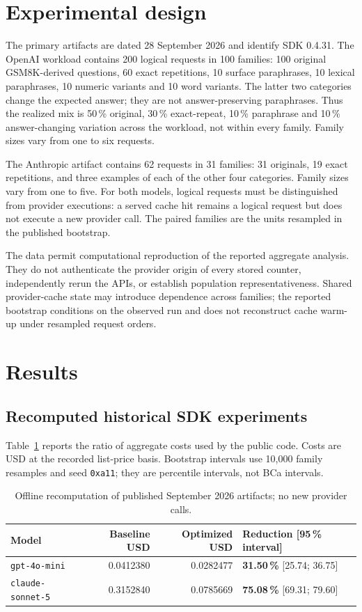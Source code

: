 \documentclass[11pt,a4paper]{article}
\begin{document}
\section{Experimental design}\label{sec:diseno}
The primary artifacts are dated 28 September 2026 and identify SDK 0.4.31. The OpenAI workload
contains 200 logical requests in 100 families: 100 original GSM8K-derived questions, 60 exact
repetitions, 10 surface paraphrases, 10 lexical paraphrases, 10 numeric variants and 10 word
variants. The latter two categories change the expected answer; they are not answer-preserving
paraphrases. Thus the realized mix is 50\,\% original, 30\,\% exact-repeat, 10\,\% paraphrase
and 10\,\% answer-changing variation across the workload, not within every family. Family sizes
vary from one to six requests.

The Anthropic artifact contains 62 requests in 31 families: 31 originals, 19 exact repetitions,
and three examples of each of the other four categories. Family sizes vary from one to five. For
both models, logical requests must be distinguished from provider executions: a served cache hit
remains a logical request but does not execute a new provider call. The paired families are the
units resampled in the published bootstrap.

The data permit computational reproduction of the reported aggregate analysis. They do not
authenticate the provider origin of every stored counter, independently rerun the APIs, or
establish population representativeness. Shared provider-cache state may introduce dependence
across families; the reported bootstrap conditions on the observed run and does not reconstruct
cache warm-up under resampled request orders.

\section{Results}\label{sec:resultados}

\subsection{Recomputed historical SDK experiments}
Table~\ref{tab:hist} reports the ratio of aggregate costs used by the public code. Costs are USD
at the recorded list-price basis. Bootstrap intervals use 10{,}000 family resamples and seed
\texttt{0xa11}; they are percentile intervals, not BCa intervals.

\begin{table}[h]
\centering
\begin{tabular}{lrrl}
\toprule
Model & Baseline USD & Optimized USD & Reduction [95\,\% interval] \\
\midrule
\texttt{gpt-4o-mini} & 0.0412380 & 0.0282477 & \textbf{31.50\,\%} [25.74; 36.75] \\
\texttt{claude-sonnet-5} & 0.3152840 & 0.0785669 & \textbf{75.08\,\%} [69.31; 79.60] \\
\bottomrule
\end{tabular}
\caption{Offline recomputation of published September 2026 artifacts; no new provider calls.}
\label{tab:hist}
\end{table}
\end{document}
